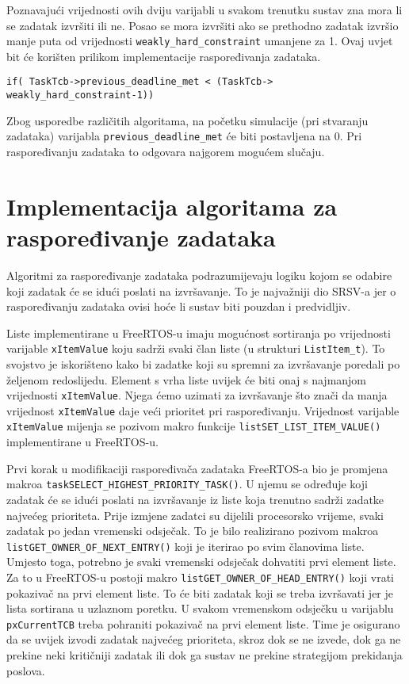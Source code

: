 \documentclass[../zavrsni.tex]{subfiles}
\begin{document}
Poznavajući vrijednosti ovih dviju varijabli u svakom trenutku sustav zna mora li se zadatak izvršiti ili ne. Posao se mora izvršiti
ako se prethodno zadatak izvršio manje puta od vrijednosti \texttt{weakly\_hard\_constraint} umanjene za 1. Ovaj uvjet bit će 
korišten prilikom implementacije raspoređivanja zadataka.

\begin{lstlisting}[style=CStyle,caption={Uvjet za slučaj kada se zadatak mora izvršiti},captionpos=b]
if( TaskTcb->previous_deadline_met < (TaskTcb->
weakly_hard_constraint-1))
\end{lstlisting}

Zbog usporedbe različitih algoritama, na početku simulacije (pri stvaranju zadataka) varijabla \texttt{previous\_deadline\_met} će 
biti postavljena na 0. Pri raspoređivanju zadataka to odgovara najgorem mogućem slučaju.

\section{Implementacija algoritama za raspoređivanje zadataka}

Algoritmi za raspoređivanje zadataka podrazumijevaju logiku kojom se odabire koji zadatak će se idući poslati na izvršavanje.
To je najvažniji dio SRSV-a jer o raspoređivanju zadataka ovisi hoće li sustav biti pouzdan i predvidljiv.

Liste implementirane u FreeRTOS-u imaju mogućnost sortiranja po vrijednosti varijable \texttt{xItemValue} koju sadrži svaki član liste 
(u strukturi \texttt{ListItem\_t}). To svojstvo je iskorišteno kako bi zadatke koji su spremni za izvršavanje poredali po željenom 
redoslijedu. Element s vrha liste uvijek će biti onaj s najmanjom vrijednosti \texttt{xItemValue}. Njega ćemo uzimati za izvršavanje 
 što znači da manja vrijednost \texttt{xItemValue} daje veći prioritet pri raspoređivanju.
Vrijednost varijable \texttt{xItemValue} mijenja se pozivom makro funkcije \texttt{listSET\_LIST\_ITEM\_VALUE()} 
implementirane u FreeRTOS-u.

Prvi korak u modifikaciji raspoređivača zadataka FreeRTOS-a bio je promjena makroa \texttt{taskSELECT\_HIGHEST\_PRIORITY\_TASK()}.
U njemu se određuje koji zadatak će se idući poslati na izvršavanje iz liste koja trenutno sadrži zadatke najvećeg prioriteta.
Prije izmjene zadatci su dijelili procesorsko vrijeme, svaki zadatak po jedan vremenski odsječak. To je bilo realizirano pozivom
makroa \texttt{listGET\_OWNER\_OF\_NEXT\_ENTRY()} koji je iterirao po svim članovima liste. Umjesto toga, potrebno je svaki vremenski odsječak
dohvatiti prvi element liste. Za to u FreeRTOS-u postoji makro \texttt{listGET\_OWNER\_OF\_HEAD\_ENTRY()} koji vrati pokazivač na 
prvi element liste. To će biti zadatak koji se treba izvršavati jer je lista sortirana u uzlaznom poretku. 
U svakom vremenskom odsječku u varijablu \texttt{pxCurrentTCB} treba pohraniti pokazivač na prvi element liste. Time je osigurano da
se uvijek izvodi zadatak najvećeg prioriteta, skroz dok se ne izvede, dok ga ne prekine neki kritičniji zadatak ili dok ga sustav 
ne prekine strategijom prekidanja poslova.
\end{document}
